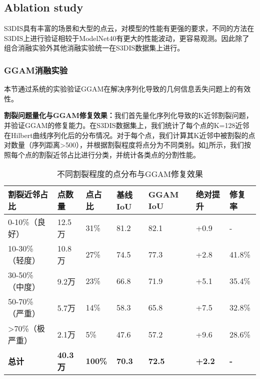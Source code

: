 \documentclass[preprint,12pt]{elsarticle}
\begin{document}
\subsection{Ablation study}
S3DIS具有丰富的场景和大型的点云，对模型的性能有更强的要求，不同的方法在S3DIS上进行验证相较于ModelNet40有更大的性能波动，更容易观测。因此除了组合消融实验外其他消融实验统一在S3DIS数据集上进行。




\subsubsection{GGAM消融实验}

本节通过系统的实验验证GGAM在解决序列化导致的几何信息丢失问题上的有效性。


\textbf{割裂问题量化与GGAM修复效果：}我们首先量化序列化导致的K近邻割裂问题，并验证GGAM的修复能力。在S3DIS数据集上，我们统计了每个点的K=128近邻在Hilbert曲线序列化后的分布情况。对于每个点，我们计算其K近邻中被割裂的点对数量（序列距离>500），并根据割裂程度将点分为不同类别。如\cref{tab:split_and_repair}所示，我们按照每个点的割裂近邻占比进行分类，并统计各类点的分割性能。

\begin{table}[htbp!]
	\centering
	\caption{不同割裂程度的点分布与GGAM修复效果}
	\label{tab:split_and_repair}
	\begin{tabular}{@{}lllllll@{}}
		\toprule
		割裂近邻占比 & 点数量 & 点占比 & 基线IoU & GGAM IoU & 绝对提升 & 修复率 \\ 
		\midrule
		0-10\%（良好） & 12.5万 & 31\% & 81.2 & 82.1 & +0.9 & - \\
		\midrule
		10-30\%（轻度） & 10.8万 & 27\% & 74.5 & 77.3 & +2.8 & 41.8\% \\
		30-50\%（中度） & 9.2万 & 23\% & 66.8 & 71.9 & +5.1 & 35.4\% \\
		50-70\%（严重） & 5.7万 & 14\% & 58.3 & 65.8 & +7.5 & 32.8\% \\
		>70\%（极严重） & 2.1万 & 5\% & 47.6 & 57.2 & +9.6 & 28.6\% \\
		\midrule
		\textbf{总计} & \textbf{40.3万} & \textbf{100\%} & \textbf{70.3} & \textbf{72.5} & \textbf{+2.2} & \textbf{-} \\
		\bottomrule
	\end{tabular}
\end{table}
\end{document}
